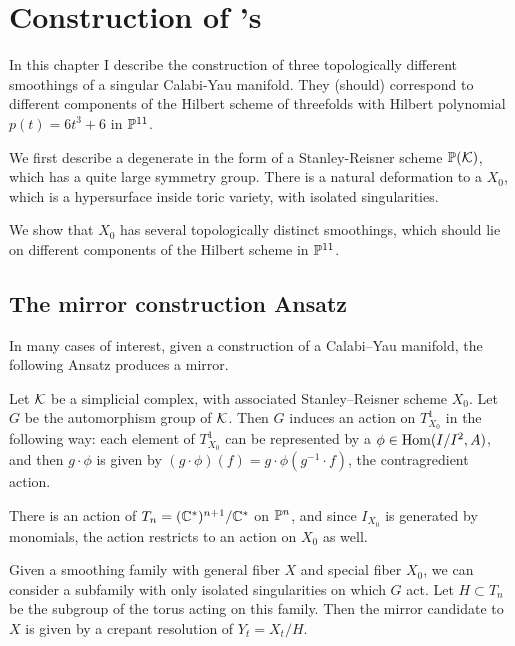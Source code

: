 \chapter{Construction of \CY's}
\label{sec:constructions}

In this chapter I describe the construction of three topologically different smoothings of a singular Calabi-Yau manifold. They (should) correspond to different components of the Hilbert scheme of threefolds with Hilbert polynomial $p(t)=6t^3+6$ in $\P^{11}$. 

We first describe a degenerate \CY in the form of a Stanley-Reisner scheme $\P(\K)$, which has a quite large symmetry group. There is a natural deformation to a $X_0$, which is a hypersurface inside toric variety, with isolated singularities.

We show that $X_0$ has several topologically distinct smoothings, which should lie on different components of the Hilbert scheme in $\P^{11}$.

\section{The mirror construction Ansatz} %
\label{sec:the_mirror_construction_ansatz}

In many cases of interest, given a construction of a Calabi--Yau manifold, the following Ansatz produces a mirror.

Let $\K$ be a simplicial complex, with associated Stanley--Reisner scheme $X_0$. Let $G$ be the automorphism group of $\K$. Then $G$ induces an action on $T_{X_0}^1$ in the following way: each element of $T_{X_0}^1$ can be represented by a $\phi \in \Hom(I/I^2,A)$, and then $g \cdot \phi$ is given by $(g \cdot \phi)(f) = g \cdot \phi(g^{-1} \cdot f)$, the contragredient action.

There is an action of $T_n=(\C^\ast)^{n+1}/\C^\ast$ on $\P^n$, and since $I_{X_0}$ is generated by monomials, the action restricts to an action on $X_0$ as well.

Given a smoothing family with general fiber $X$ and special fiber $X_0$, we can consider a subfamily with only isolated singularities on which $G$ act.  Let $H \subset T_n$ be the subgroup of the torus acting on this family. Then the mirror candidate to $X$ is given by a crepant resolution of $Y_t=X_t/H$.

